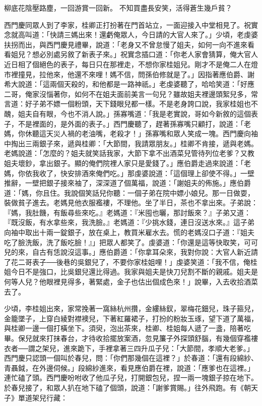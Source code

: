 柳底花陰壓路塵，一回游賞一回新。
不知買盡長安笑，活得蒼生幾戶貧？

西門慶同眾人到了李家，桂卿正打扮著在門首站立，一面迎接入中堂相見了。祝實念就高叫道：「快請三媽出來！還虧俺眾人，今日請的大官人來了。」少頃，老虔婆扶拐而出，與西門慶見禮畢，說道：「老身又不曾怠慢了姐夫，如何一向不進來看看姐兒？想必別處另敘了新表子來。」祝實念插口道：「你老人家會猜算，俺大官人近日相了個絕色的表子，每日只在那裡走，不想你家桂姐兒。剛才不是俺二人在燈市裡撞見，拉他來，他還不來哩！媽不信，問孫伯修就是了。」因指著應伯爵、謝希大說道：「這兩個天殺的，和他都是一路神祇。」老虔婆聽了，哈哈笑道：「好應二哥，俺家沒惱著你，如何不在姐夫面前美言一句兒？雖故姐夫裡邊頭絮兒多，常言道：好子弟不嫖一個粉頭，天下錢眼兒都一樣。不是老身誇口說，我家桂姐也不醜，姐夫自有眼，今也不消人說。」孫寡嘴道：「我是老實說，哥如今新敘的這個表子，不是裡面的，是外面的表子。」西門慶聽了，趕著孫寡嘴只顧打，說道：「老媽，你休聽這天災人禍的老油嘴，老殺才！」孫寡嘴和眾人笑成一塊。西門慶向袖中掏出三兩銀子來，遞與桂卿：「大節間，我請眾朋友。」桂卿不肯接，遞與老媽。老媽說道：「怎麼的？姐夫就笑話我家，大節下拿不出酒菜兒管待列位老爹？又教姐夫壞鈔，拿出銀子。顯的俺們院裡人家只是愛錢了。」應伯爵走過來說道：「老媽，你依我收了，快安排酒來俺們吃。」那虔婆說道：「這個理上卻使不得。」一壁推辭，一壁把銀子接來袖了，深深道了個萬福，說道：「謝姐夫的佈施。」應伯爵道：「媽，你且住。我說個笑話兒你聽：一個子弟在院中嫖小娘兒。那一日做耍，裝做貧子進去。老媽見他衣服襤褸，不理他。坐了半日，茶也不拿出來。子弟說：『媽，我肚饑，有飯尋些來吃。』老媽道：『米囤也曬，那討飯來？』子弟又道：『既沒飯，有水拿些來，我洗臉。』老媽道：『少挑水錢，連日沒送水來。』這子弟向袖中取出十兩一錠銀子，放在桌上，教買米雇水去。慌的老媽沒口子道：『姐夫吃了臉洗飯，洗了飯吃臉！』」把眾人都笑了。虔婆道：「你還是這等快取笑，可可兒的來，自古有恁說沒這事。」應伯爵道：「你拿耳朵來，我對你說：大官人新近請了花二哥表子──後巷的吳銀兒了，不要你家桂姐哩！」虔婆笑道：「我不信，俺桂姐今日不是強口，比吳銀兒還比得過。我家與姐夫是快刀兒割不斷的親戚。姐夫是何等人兒？他眼裡見得多，著緊處，金子也估出個成色來！」說畢，入去收拾酒菜去了。

少頃，李桂姐出來，家常挽著一窩絲杭州攢，金縷絲釵，翠梅花鈿兒，珠子箍兒，金籠墜子，上穿白綾對襟襖兒，下著紅羅裙子，打扮的粉妝玉琢，望下道了萬福，與桂卿一邊一個打橫坐下。須臾，泡出茶來，桂卿、桂姐每人遞了一盞，陪著吃畢。保兒就來打抹春台，才待收拾擺放案酒，忽見簾子外探頭舒腦，有幾個穿襤褸衣者──謂之架兒，進來跪下，手裡拿著三四升瓜子兒：「大節間，孝順大老爹。」西門慶只認頭一個叫於春兒，問：「你們那幾個在這裡？」於春道：「還有段綿紗、青聶鉞，在外邊伺候。」段綿紗進來，看見應伯爵在裡，說道：「應爹也在這裡。」連忙磕了頭。西門慶吩咐收了他瓜子兒，打開銀包兒，捏一兩一塊銀子掠在地下。於春兒接了，和眾人扒在地下磕了個頭，說道：「謝爹賞賜。」往外飛跑。有《朝天子》單道架兒行藏：

